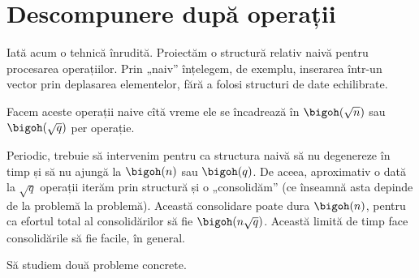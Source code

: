\section{Descompunere după operații}

Iată acum o tehnică înrudită. Proiectăm o structură relativ naivă pentru procesarea operațiilor. Prin „naiv” înțelegem, de exemplu, inserarea într-un vector prin deplasarea elementelor, fără a folosi structuri de date echilibrate.

Facem aceste operații naive cîtă vreme ele se încadrează în $\bigoh(\sqrt{n})$ sau $\bigoh(\sqrt{q})$ per operație.

Periodic, trebuie să intervenim pentru ca structura naivă să nu degenereze în timp și să nu ajungă la $\bigoh(n)$ sau $\bigoh(q)$. De aceea, aproximativ o dată la $\sqrt{q}$ operații iterăm prin structură și o „consolidăm” (ce înseamnă asta depinde de la problemă la problemă). Această consolidare poate dura $\bigoh(n)$, pentru ca efortul total al consolidărilor să fie $\bigoh(n \sqrt{q})$. Această limită de timp face consolidările să fie facile, în general.

Să studiem două probleme concrete.
